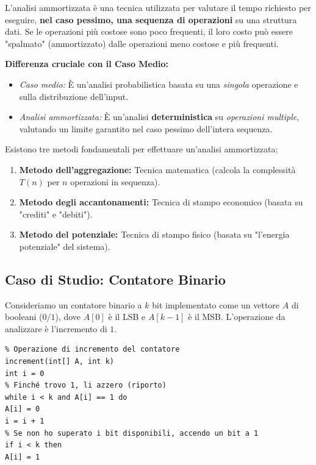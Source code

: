 \documentclass[12pt, a4paper]{article}
\begin{document}
\begin{tcolorbox}[colback=lightergray!10, colframe=tocsec, title=\textbf{Definizione: Analisi Ammortizzata}]
L'analisi ammortizzata è una tecnica utilizzata per valutare il tempo richiesto per eseguire, \textbf{nel caso pessimo, una sequenza di operazioni} su una struttura dati.
Se le operazioni più costose sono poco frequenti, il loro costo può essere "spalmato" (ammortizzato) dalle operazioni meno costose e più frequenti.
\end{tcolorbox}

\textbf{Differenza cruciale con il Caso Medio:}
\begin{itemize}
\item \textit{Caso medio:} È un'analisi probabilistica basata su una \textit{singola} operazione e sulla distribuzione dell'input.
\item \textit{Analisi ammortizzata:} È un'analisi \textbf{deterministica} su \textit{operazioni multiple}, valutando un limite garantito nel caso pessimo dell'intera sequenza.
\end{itemize}

Esistono tre metodi fondamentali per effettuare un'analisi ammortizzata:
\begin{enumerate}
\item \textbf{Metodo dell'aggregazione:} Tecnica matematica (calcola la complessità $T(n)$ per $n$ operazioni in sequenza).
\item \textbf{Metodo degli accantonamenti:} Tecnica di stampo economico (basata su "crediti" e "debiti").
\item \textbf{Metodo del potenziale:} Tecnica di stampo fisico (basata su "l'energia potenziale" del sistema).
\end{enumerate}

\subsection{Caso di Studio: Contatore Binario}
Consideriamo un contatore binario a $k$ bit implementato come un vettore $A$ di booleani ($0/1$), dove $A[0]$ è il LSB e $A[k-1]$ è il MSB. L'operazione da analizzare è l'incremento di $1$.

\begin{verbatim}
% Operazione di incremento del contatore
increment(int[] A, int k)
int i = 0
% Finché trovo 1, li azzero (riporto)
while i < k and A[i] == 1 do
A[i] = 0
i = i + 1
% Se non ho superato i bit disponibili, accendo un bit a 1
if i < k then
A[i] = 1
\end{verbatim}
\end{document}
